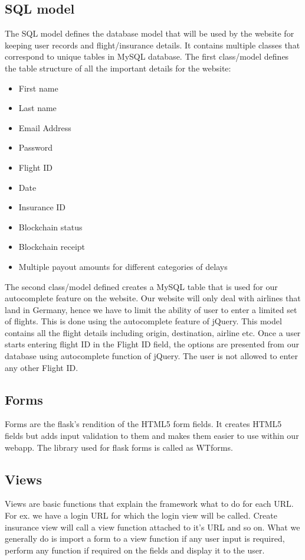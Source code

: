 \subsection{SQL model}
The SQL model defines the database model that will be used by the website for keeping user records and flight/insurance details. It contains multiple classes that correspond to unique tables in MySQL database. The first class/model defines the table structure of all the important details for the website:
\begin{itemize}
    \item First name
    \item Last name
    \item Email Address
    \item Password
    \item Flight ID
    \item Date
    \item Insurance ID
    \item Blockchain status
    \item Blockchain receipt
    \item Multiple payout amounts for different categories of delays
\end{itemize}

The second class/model defined creates a MySQL table that is used for our autocomplete feature on the website. Our website will only deal with airlines that land in Germany, hence we have to limit the ability of user to enter a limited set of flights. This is done using the autocomplete feature of jQuery. This model contains all the flight details including origin, destination, airline etc. Once a user starts entering flight ID in the Flight ID field, the options are presented from our database using autocomplete function of jQuery. The user is not allowed to enter any other Flight ID. 

\subsection{Forms}
Forms are the flask's rendition of the HTML5 form fields. It creates HTML5 fields but adds input validation to them and makes them easier to use within our webapp. The library used for flask forms is called as WTforms. 

\subsection{Views}
Views are basic functions that explain the framework what to do for each URL. For ex. we have a login URL for which the login view will be called. Create insurance view will call a view function attached to it's URL and so on. What we generally do is import a form to a view function if any user input is required, perform any function if required on the fields and display it to the user.

